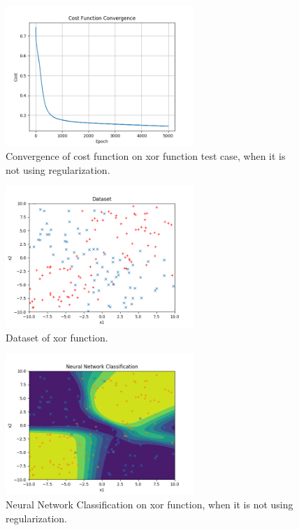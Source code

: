 \documentclass[journal]{IEEEtran}
\begin{document}
\begin{figure}
  \begin{center}
  \includegraphics[width=2.8in]{./../code/xor_result/convergence_xor_l0_0.png}
  \caption{Convergence of cost function on xor function test case, when it is not using regularization.}
  \label{img:xor_cost_no_reg}
  \end{center}
\end{figure}

\begin{figure}
  \begin{center}
  \includegraphics[width=2.8in]{./../code/xor_result/dataset_xor_l0_0.png}
  \caption{Dataset of xor function.}
  \label{img:xor_data_set}
  \end{center}
\end{figure}

\begin{figure}
    \begin{center}
    \includegraphics[width=2.8in]{./../code/xor_result/nn_classification_xor_l0_0.png}
    \caption{Neural Network Classification on xor function, when it is not using regularization.}
    \label{img:xor_classification_no_reg}
    \end{center}
\end{figure}
\end{document}
